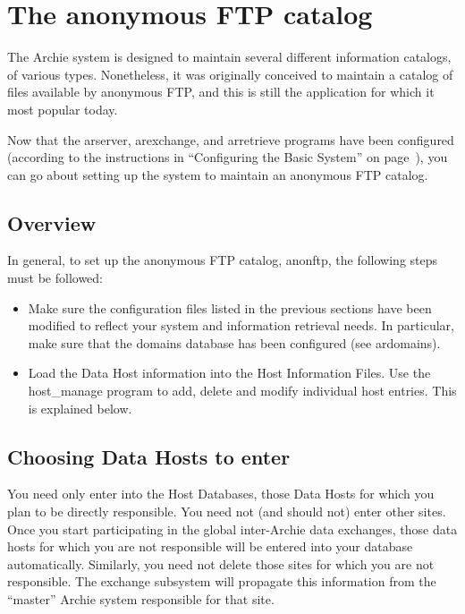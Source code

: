 %
%
%
%

\chapter{The anonymous FTP catalog}


The Archie system is designed to maintain several different information
catalogs, of various types. Nonetheless, it was originally conceived to
maintain a catalog of files available by anonymous FTP, and this is still the
application for which it most popular today.

Now that the arserver, arexchange, and arretrieve programs have been
configured (according to the instructions in ``Configuring the Basic System'' on
page~\pageref{chap:configure}), you can go about setting up the system to
maintain an anonymous FTP catalog.


\section{Overview}

In general, to set up the anonymous FTP catalog, anonftp, the following steps
must be followed:

\begin{itemize}
\item
Make sure the configuration files listed in the previous sections have been
modified to reflect your system and information retrieval needs. In
particular, make sure that the domains database has been configured (see
ardomains).

\item
 Load the Data Host information into the Host Information Files.
Use the host\_manage program to
add, delete and modify individual host entries.  This is explained below.
\end{itemize}

\section{Choosing Data Hosts to enter}

You need only enter into the Host Databases, those Data Hosts for which you
plan to be directly responsible. You need not (and should not) enter other
sites. Once you start participating in the global inter-Archie data exchanges,
those data hosts for which you are not responsible will be entered into your
database automatically. Similarly, you need not delete those sites for which
you are not responsible. The exchange subsystem will propagate this
information from the ``master'' Archie system responsible for that site.




